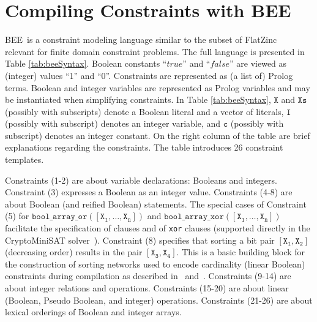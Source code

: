 \documentclass[runningheads,a4paper]{llncs}
\newcommand{\true}{\texttt{true}}
\newcommand{\false}{\mathit{false}}
\renewcommand{\true}{\mathit{true}}
\newcommand{\bee}{\textsf{BEE}}
\begin{document}
\section{Compiling Constraints with \bee}

\bee\ is a constraint modeling language similar to the subset of
FlatZinc~\cite{miniZinc2007} relevant for finite domain constraint
problems. The full language is presented in Table \ref{tab:beeSyntax}.
Boolean constants ``$\true$'' and ``$\false$'' are viewed as (integer)
values ``1'' and ``0''.  Constraints are represented as (a list of)
Prolog terms. Boolean and integer variables are represented as Prolog
variables and may be instantiated when simplifying constraints.
In Table \ref{tab:beeSyntax}, $\mathtt{X}$ and $\mathtt{Xs}$ (possibly
with subscripts) denote a Boolean literal and a vector of literals,
$\mathtt{I}$ (possibly with subscript) denotes an integer variable,
and $\mathtt{c}$ (possibly with subscript) denotes an integer
constant.  On the right column of the table are brief explanations
regarding the constraints. The table introduces 26 constraint
templates.

Constraints (1-2) are about variable declarations: Booleans and
integers. Constraint (3) expresses a Boolean as an integer value.
Constraints (4-8) are about Boolean (and reified Boolean)
statements. The special cases of Constraint (5) for
$\mathtt{bool\_array\_or([X_1,\ldots,X_n])}$ and
$\mathtt{bool\_array\_xor([X_1,\ldots,X_n])}$ facilitate the
specification of clauses and of \texttt{xor} clauses (supported
directly in the CryptoMiniSAT solver~\cite{Crypto}).
Constraint (8) specifies that sorting a bit pair $\mathtt{[X_1,X_2]}$
(decreasing order) results in the pair $\mathtt{[X_3,X_4]}$. This is a
basic building block for the construction of sorting networks
\cite{Batcher68} used to encode cardinality (linear Boolean)
constraints during compilation as described in~\cite{AsinNOR11}
and~\cite{DBLP:conf/lpar/CodishZ10}.
Constraints (9-14) are about integer relations and operations.
Constraints (15-20) are about linear (Boolean, Pseudo Boolean, and
integer) operations.
Constraints (21-26) are about lexical orderings of Boolean and integer
arrays.  
\end{document}
